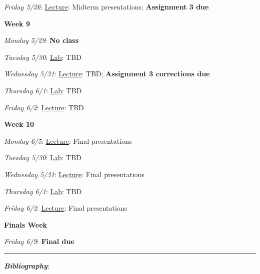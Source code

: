 \documentclass[12pt]{article}
\begin{document}
\emph{Friday 5/26}: \underline{Lecture}: Midterm presentations; \textbf{Assignment 3 due}

\noindent\textbf{Week 9}

\emph{Monday 5/29}: \textbf{No class}

\emph{Tuesday 5/30}: \underline{Lab}: TBD

\emph{Wednesday 5/31}: \underline{Lecture}: TBD;  \textbf{Assignment 3 corrections due}

\emph{Thursday 6/1}: \underline{Lab}: TBD

\emph{Friday 6/2}: \underline{Lecture}: TBD

\noindent\textbf{Week 10}

\emph{Monday 6/5}: \underline{Lecture}: Final presentations

\emph{Tuesday 5/30}: \underline{Lab}: TBD

\emph{Wednesday 5/31}: \underline{Lecture}: Final presentations

\emph{Thursday 6/1}: \underline{Lab}: TBD

\emph{Friday 6/2}: \underline{Lecture}: Final presentations

\noindent\textbf{Finals Week}

\emph{Friday 6/9}: \textbf{Final due}

\begin{center}
  \rule{\textwidth}{0.5pt}
\end{center}
\nocite{*}

\noindent\textbf{\emph{Bibliography}}:\\
\end{document}
